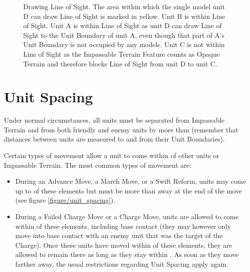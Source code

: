 \begin{figure}[!htbp]
	\begin{minipage}{0.62\textwidth}
	\renewcommand{\figbiglettersize}{17}
	\def\svgwidth{\textwidth}
	
	\end{minipage}\hfill\begin{minipage}{0.35\textwidth}
	\caption{Drawing Line of Sight.\captionpar
		The area within which the single model unit D can draw Line of Sight is marked in yellow.
		\captionlist
			\captionitem \textbullet{} Unit B is within Line of Sight.\newline
			\captionitem \textbullet{} Unit A is within Line of Sight as unit D can draw Line of Sight to the Unit Boundary of unit A, even though that part of A's Unit Boundary is not occupied by any models.\newline
			\captionitem \textbullet{} Unit C is not within Line of Sight as the Impassable Terrain Feature counts as Opaque Terrain and therefore blocks Line of Sight from unit D to unit C.%
		}
	\label{figure/line_of_sight}
	\end{minipage}
\end{figure}

\section{Unit Spacing}
\label{unit_spacing}

Under normal circumstances, all units must be separated from Impassable Terrain and from both friendly and enemy units by more than  (remember that distances between units are measured to and from their Unit Boundaries).

Certain types of movement allow a unit to come within  of other units or Impassable Terrain. The most common types of movement are:

\begin{itemize}
\item During an Advance Move, a March Move, or a Swift Reform, units may come up to  of these elements but must be more than  away at the end of the move (see figure \ref{figure/unit_spacing}).
\item During a Failed Charge Move or a Charge Move, units are allowed to come within  of these elements, including base contact (they may however only move into base contact with an enemy unit that was the target of the Charge).\newline
Once these units have moved within  of these elements, they are allowed to remain there as long as they stay within . As soon as they move farther away, the usual restrictions regarding Unit Spacing apply again.
\end{itemize}

